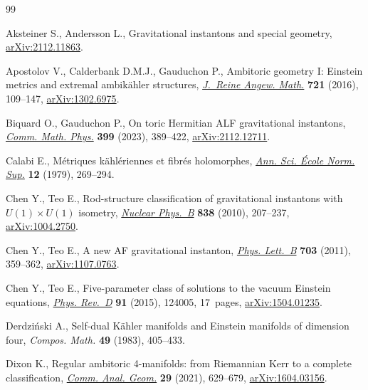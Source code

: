\documentclass[10pt,a4paper]{amsart}
\numberwithin{equation}{section}
\begin{document}
\begin{thebibliography}{99}
\footnotesize\itemsep=0pt

Aksteiner S., Andersson L., Gravitational instantons and special geometry,
 \href{https://arxiv.org/abs/2112.11863}{arXiv:2112.11863}.

Apostolov V., Calderbank D.M.J., Gauduchon P., Ambitoric geometry {I}:
 {E}instein metrics and extremal ambik\"ahler structures, \href{https://doi.org/10.1515/crelle-2014-0060}{\textit{J.~Reine
 Angew. Math.}} \textbf{721} (2016), 109--147, \href{https://arxiv.org/abs/1302.6975}{arXiv:1302.6975}.

Biquard O., Gauduchon P., On toric {H}ermitian {ALF} gravitational instantons,
 \href{https://doi.org/10.1007/s00220-022-04562-z}{\textit{Comm. Math. Phys.}} \textbf{399} (2023), 389--422,
 \href{https://arxiv.org/abs/2112.12711}{arXiv:2112.12711}.

Calabi E., M\'etriques k\"ahl\'eriennes et fibr\'es holomorphes, \href{https://doi.org/10.24033/asens.1367}{\textit{Ann.
 Sci. \'Ecole Norm. Sup.}} \textbf{12} (1979), 269--294.

Chen Y., Teo E., Rod-structure classification of gravitational instantons with
 {$U(1)\times U(1)$} isometry, \href{https://doi.org/10.1016/j.nuclphysb.2010.05.017}{\textit{Nuclear Phys.~B}} \textbf{838} (2010),
 207--237, \href{https://arxiv.org/abs/1004.2750}{arXiv:1004.2750}.

Chen Y., Teo E., A new {AF} gravitational instanton, \href{https://doi.org/10.1016/j.physletb.2011.07.076}{\textit{Phys. Lett.~B}}
 \textbf{703} (2011), 359--362, \href{https://arxiv.org/abs/1107.0763}{arXiv:1107.0763}.

Chen Y., Teo E., Five-parameter class of solutions to the vacuum {E}instein
 equations, \href{https://doi.org/10.1103/PhysRevD.91.124005}{\textit{Phys. Rev.~D}} \textbf{91} (2015), 124005, 17~pages,
 \href{https://arxiv.org/abs/1504.01235}{arXiv:1504.01235}.

Derdzi\'nski A., Self-dual {K}\"ahler manifolds and {E}instein manifolds of
 dimension four, \textit{Compos. Math.} \textbf{49} (1983), 405--433.

Dixon K., Regular ambitoric 4-manifolds: from {R}iemannian {K}err to a complete
 classification, \href{https://doi.org/10.4310/CAG.2021.v29.n3.a3}{\textit{Comm. Anal. Geom.}} \textbf{29} (2021), 629--679,
 \href{https://arxiv.org/abs/1604.03156}{arXiv:1604.03156}.


\end{thebibliography}
\end{document}
